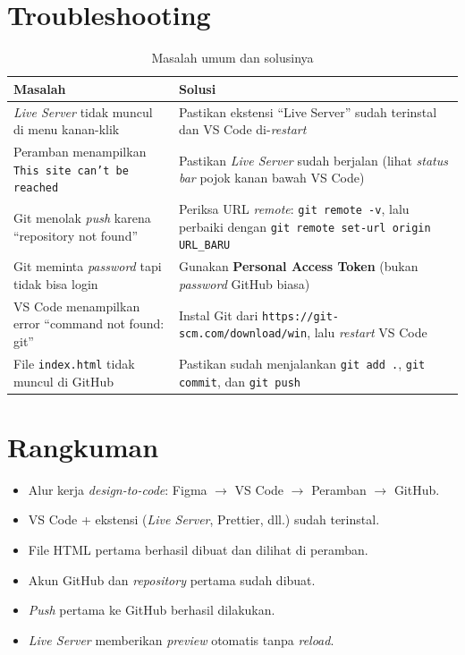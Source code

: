 \section{Troubleshooting}
\label{sec:m01-troubleshoot}

\begin{table}[ht]
\centering
\caption{Masalah umum dan solusinya}
\label{tab:m01-troubleshoot}
\small
\begin{tabular}{p{4.5cm}p{8cm}}
\toprule
\textbf{Masalah} & \textbf{Solusi} \\
\midrule
\emph{Live Server} tidak muncul di menu kanan-klik & Pastikan ekstensi ``Live Server'' sudah terinstal dan VS Code di-\emph{restart} \\
Peramban menampilkan \texttt{This site can't be reached} & Pastikan \emph{Live Server} sudah berjalan (lihat \emph{status bar} pojok kanan bawah VS Code) \\
Git menolak \emph{push} karena ``repository not found'' & Periksa URL \emph{remote}: \texttt{git remote -v}, lalu perbaiki dengan \texttt{git remote set-url origin URL\_BARU} \\
Git meminta \emph{password} tapi tidak bisa login & Gunakan \textbf{Personal Access Token} (bukan \emph{password} GitHub biasa) \\
VS Code menampilkan error ``command not found: git'' & Instal Git dari \texttt{https://git-scm.com/download/win}, lalu \emph{restart} VS Code \\
File \texttt{index.html} tidak muncul di GitHub & Pastikan sudah menjalankan \texttt{git add .}, \texttt{git commit}, dan \texttt{git push} \\
\bottomrule
\end{tabular}
\end{table}

\section{Rangkuman}
\label{sec:m01-rangkuman}

\begin{itemize}
  \item Alur kerja \emph{design-to-code}: Figma $\rightarrow$ VS Code $\rightarrow$ Peramban $\rightarrow$ GitHub.
  \item VS Code + ekstensi (\emph{Live Server}, Prettier, dll.) sudah terinstal.
  \item File HTML pertama berhasil dibuat dan dilihat di peramban.
  \item Akun GitHub dan \emph{repository} pertama sudah dibuat.
  \item \emph{Push} pertama ke GitHub berhasil dilakukan.
  \item \emph{Live Server} memberikan \emph{preview} otomatis tanpa \emph{reload}.
\end{itemize}
